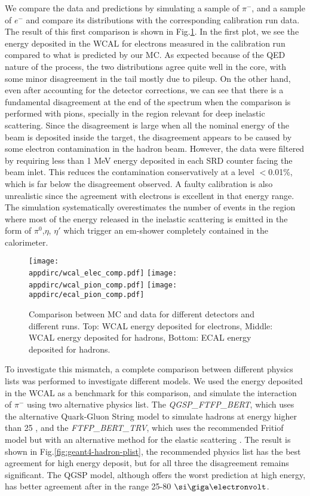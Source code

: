 We compare the data and predictions by simulating a sample of $\pi^-$, and a sample of $e^-$ and compare its distributions with the corresponding calibration run data. The result of this first comparison is shown in Fig.\ref{fig:ecal-comp}. In the first plot, we see the energy deposited in the WCAL for electrons measured in the calibration run compared to what is predicted by our MC. As expected because of the QED nature of the process, the two distributions agree quite well in the core, with some minor disagreement in the tail mostly due to pileup. On the other hand, even after accounting for the detector corrections, we can see that there is a fundamental disagreement at the end of the spectrum when the comparison is performed with pions, specially in the region relevant for deep inelastic scattering. Since the disagreement is large when all the nominal energy of the beam is deposited inside the target, the disagreement appears to be caused by some electron contamination in the hadron beam. However, the data were filtered by requiring less than 1 MeV energy deposited in each SRD counter facing the beam inlet. This reduces the contamination conservatively at a level $<$0.01\%, which is far below the disagreement observed. A faulty calibration is also unrealistic since the agreement with electrons is excellent in that energy range. The simulation systematically overestimates the number of events in the region where most of the energy released in the inelastic scattering is emitted in the form of $\pi^0$,$\eta$, $\eta'$ which trigger an em-shower completely contained in the calorimeter.

\begin{figure}[bth!]
  \centering
  \texttt{[image: \\appdirc/wcal\_elec\_comp.pdf]}
  \texttt{[image: \\appdirc/wcal\_pion\_comp.pdf]}
  \texttt{[image: \\appdirc/ecal\_pion\_comp.pdf]}
  \caption[MC/DATA Comparison of $\pi^-$ in ECAL and WCAL]{Comparison between MC and data for different detectors and different runs. Top: WCAL energy deposited for electrons, Middle: WCAL energy deposited for hadrons, Bottom: ECAL energy deposited for hadrons.}
  \label{fig:ecal-comp}
\end{figure}

To investigate this mismatch, a complete comparison between different physics lists was performed to investigate 
different models. We used the energy deposited in the WCAL as a benchmark for this comparison, and simulate the interaction of $\pi^-$ using two alternative physics list. The \textit{QGSP\_FTFP\_BERT}, which uses the alternative Quark-Gluon String model to simulate hadrons at energy higher than 25 \gev, and the \textit{FTFP\_BERT\_TRV}, which uses the recommended Fritiof model but with an alternative method for the elastic scattering \cite{AGOSTINELLI2003250}. The result is shown in Fig.\ref{fig:geant4-hadron-plist}, the recommended physics list has the best agreement for high energy deposit, but for all three the disagreement remains significant. The QGSP model, although offers the worst prediction at high energy, has better agreement after in the range 25-80 $\gev$.

